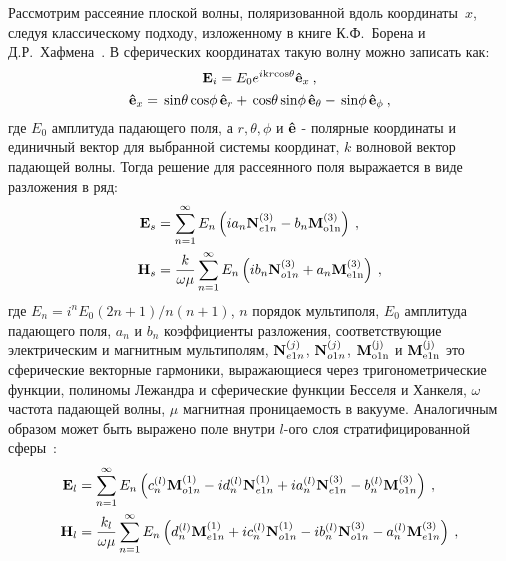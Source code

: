 Рассмотрим рассеяние плоской волны, поляризованной вдоль
координаты~$x$, следуя классическому подходу, изложенному в книге
К.Ф.~Борена и Д.Р.~Хафмена~\cite{Bohren-1983}.  В сферических
координатах такую волну можно записать как:
\begin{equation*}
  \label{eq:bh4.21}
  {\rm \mathbf{E}}_i = E_0 e^{i{\rm k}r{\rm cos}\theta}
  {\boldsymbol{\hat{\rm e}}}_{x}\:,
\end{equation*}
\begin{equation*}
{\boldsymbol{\hat{\rm e}}}_{x} = \,{\rm sin}\theta\, {\rm cos} \phi\, 
{\boldsymbol{\hat{\rm e}}}_{r} 
+\, {\rm cos}\theta\, {\rm sin} \phi\, {\boldsymbol{\hat{\rm e}}}_{\theta}
-\, {\rm sin} \phi\, {\boldsymbol{\hat{\rm e}}}_{\phi}\:,
\end{equation*}
где $E_0$ амплитуда падающего поля, а $r,\theta,\phi$ и
${\boldsymbol{\hat{\rm e}}}$ - полярные координаты и единичный вектор для
выбранной системы координат, $k$ волновой вектор падающей волны.
Тогда решение для рассеянного поля выражается в виде разложения в ряд:
\begin{align*}
{\rm \mathbf{E}}_s &=\sum_{n=1}^{\infty} E_n \left( i a_n {\rm
    \mathbf{N}}_{e1n}^{(3)} - b_n{\rm\mathbf{M}_{o1n}^{(3)}} \right)\:,\\
{\rm \mathbf{H}}_s &=\frac{k}{\omega\mu}
 \sum_{n=1}^{\infty} E_n \left( i b_n {\rm
    \mathbf{N}}_{o1n}^{(3)} + a_n{\rm\mathbf{M}_{e1n}^{(3)}} \right)\:,  
\end{align*}
где $E_n=i^nE_0(2n+1)/n(n+1)$, $n$ порядок мультиполя, $E_0$ амплитуда
падающего поля, $a_n$ и $b_n$ коэффициенты разложения, соответствующие
электрическим и магнитным мультиполям, ${\rm \mathbf{N}}_{e1n}^{(j)}$,
${\rm \mathbf{N}}_{o1n}^{(j)}$, ${\rm\mathbf{M}_{o1n}^{(j)}}$ и
${\rm\mathbf{M}_{e1n}^{(j)}}$ это сферические векторные гармоники,
выражающиеся через тригонометрические функции, полиномы Лежандра и
сферические функции Бесселя и Ханкеля, $\omega$ частота падающей
волны, $\mu$ магнитная проницаемость в вакууме.  Аналогичным образом
может быть выражено поле внутри $l$-ого слоя стратифицированной
сферы~\cite{Yang-2003}:
\begin{align}
{\rm \mathbf{E}}_l &=\sum_{n=1}^{\infty} E_n \left(
                     c_n^{(l)}{\rm\mathbf{M}}_{o1n}^{(1)}
                     -i d_n^{(l)} {\rm \mathbf{N}}_{e1n}^{(1)}
                     +i a_n^{(l)} {\rm \mathbf{N}}_{e1n}^{(3)}
                     - b_n^{(l)}{\rm\mathbf{M}}_{o1n}^{(3)} 
                     \right)\label{eq:3p1}\:,\\
{\rm \mathbf{H}}_l &=\frac{k_l}{\omega\mu} \sum_{n=1}^{\infty} E_n
                     \left(
                      d_n^{(l)}{\rm\mathbf{M}}_{e1n}^{(1)} 
                     +i c_n^{(l)} {\rm \mathbf{N}}_{o1n}^{(1)} 
                     -i b_n^{(l)} {\rm \mathbf{N}}_{o1n}^{(3)} 
                     - a_n^{(l)}{\rm\mathbf{M}}_{e1n}^{(3)} 
                     \right)\:,\label{eq:3p2}  
\end{align}
